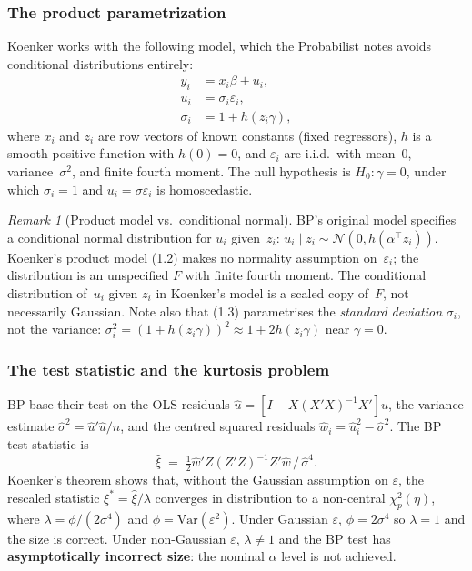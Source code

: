 \documentclass[a4paper,oneside,12pt]{extarticle}
\theoremstyle{plain}
\theoremstyle{definition}
\theoremstyle{remark}
\newtheorem{remark}[proposition]{Remark}
\newcommand*{\Var}{\mathrm{Var}}
\begin{document}
\subsubsection*{The product parametrization}

Koenker works with the following model, which the Probabilist notes avoids
conditional distributions entirely:
\begin{align}
  y_i &= x_i\beta + u_i, \tag{1.1} \\[3pt]
  u_i &= \sigma_i\varepsilon_i, \tag{1.2} \\[3pt]
  \sigma_i &= 1 + h(z_i\gamma), \tag{1.3}
\end{align}
where $x_i$ and $z_i$ are row vectors of known constants (fixed
regressors), $h$ is a smooth positive function with $h(0) = 0$, and
$\varepsilon_i$ are i.i.d.\ with mean~$0$, variance~$\sigma^2$, and
finite fourth moment.  The null hypothesis is $H_0: \gamma = 0$, under
which $\sigma_i = 1$ and $u_i = \sigma\varepsilon_i$ is homoscedastic.

\begin{remark}[Product model vs.\ conditional normal]
BP's original model specifies a conditional normal distribution for
$u_i$ given~$z_i$: $u_i \mid z_i \sim \mathcal{N}(0, h(\alpha^\top
z_i))$.  Koenker's product model (1.2) makes no normality assumption
on~$\varepsilon_i$; the distribution is an unspecified $F$ with finite
fourth moment.  The conditional distribution of~$u_i$ given $z_i$ in
Koenker's model is a scaled copy of~$F$, not necessarily Gaussian.
Note also that (1.3) parametrises the \emph{standard deviation}
$\sigma_i$, not the variance: $\sigma_i^2 = (1 + h(z_i\gamma))^2
\approx 1 + 2h(z_i\gamma)$ near $\gamma = 0$.
\end{remark}

\subsubsection*{The test statistic and the kurtosis problem}

BP base their test on the OLS residuals
$\hat{u} = [I - X(X'X)^{-1}X']u$,
the variance estimate $\hat{\sigma}^2 = \hat{u}'\hat{u}/n$,
and the centred squared residuals $\hat{w}_i = \hat{u}_i^2 -
\hat{\sigma}^2$.  The BP test statistic is
\[
  \hat\xi \;=\; \tfrac{1}{2}\hat{w}'Z(Z'Z)^{-1}Z'\hat{w}\,/\,\hat\sigma^4.
\]
Koenker's theorem shows that, without the Gaussian assumption on
$\varepsilon$, the rescaled statistic $\xi^* = \hat\xi/\lambda$
converges in distribution to a non-central $\chi^2_p(\eta)$, where
$\lambda = \phi/(2\sigma^4)$ and $\phi = \Var(\varepsilon^2)$.
Under Gaussian $\varepsilon$, $\phi = 2\sigma^4$ so $\lambda = 1$
and the size is correct.  Under non-Gaussian $\varepsilon$,
$\lambda \neq 1$ and the BP test has \textbf{asymptotically incorrect
size}: the nominal $\alpha$ level is not achieved.
\end{document}
